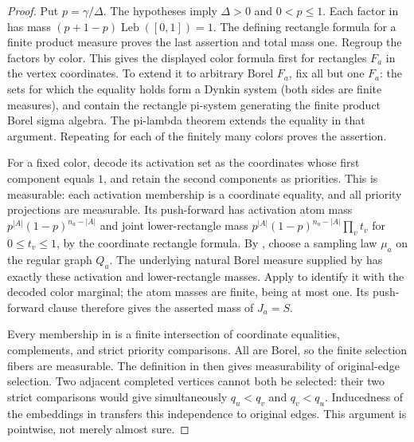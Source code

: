\begin{proof}
Put $p=\gamma/\Delta$. The hypotheses imply $\Delta>0$ and $0<p\le1$.
Each factor in  has mass
$(p+1-p)\operatorname{Leb}([0,1])=1$. The defining rectangle formula for
a finite product measure proves the last assertion and total mass one.
Regroup the factors by color. This gives the displayed color formula first
for rectangles $F_a$ in the vertex coordinates. To extend it to arbitrary
Borel $F_a$, fix all but one $F_a$: the sets for which the equality holds
form a Dynkin system (both sides are finite measures), and contain the
rectangle pi-system generating the finite product Borel sigma algebra.
The pi-lambda theorem extends the equality in that argument. Repeating
for each of the finitely many colors proves the assertion.

For a fixed color, decode its activation set as the coordinates whose
first component equals $1$, and retain the second components as priorities.
This is measurable: each activation membership is a coordinate equality,
and all priority projections are measurable. Its push-forward has activation
atom mass $p^{|A|}(1-p)^{n_a-|A|}$ and joint lower-rectangle mass
$p^{|A|}(1-p)^{n_a-|A|}\prod_v t_v$ for $0\le t_v\le1$, by the coordinate
rectangle formula. By ,
choose a sampling law $\mu_a$ on the regular graph $Q_a$.
The underlying natural Borel measure supplied by
 has exactly these activation and
lower-rectangle masses. Apply
 to identify it
with the decoded color marginal; the atom masses are finite, being at most
one. Its push-forward clause therefore gives the asserted mass of $J_a=S$.

Every membership in  is a finite
intersection of coordinate equalities, complements, and strict priority
comparisons. All are Borel, so the finite selection fibers are measurable.
The definition in  then gives measurability
of original-edge selection. Two adjacent completed vertices cannot both
be selected: their two strict comparisons would give simultaneously
$q_u<q_v$ and $q_v<q_u$. Inducedness of the embeddings in
 transfers this independence to original
edges. This argument is pointwise, not merely almost sure.
\end{proof}
